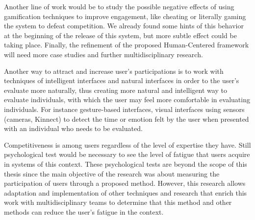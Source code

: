 Another line of work would be to study the possible negative effects of using gamification
techniques to improve engagement, like cheating or literally gaming the system
to defeat competition. We already found some hints of this behavior at the
beginning of the release of this system, but more subtle effect could be taking
place. Finally, the refinement of the proposed Human-Centered framework will
need more case studies and further multidisciplinary research.

Another way to attract and increase user’s participations is to work with
techniques of intelligent interfaces and natural interfaces in order to the
user's evaluate more naturally, thus creating more natural and intelligent way
to evaluate individuals, with which the user may feel more comfortable in
evaluating individuals. For instance  gesture-based interfaces, visual
interfaces using sensors (cameras, Kinnect) to detect the time or emotion felt
by the user when presented with an individual who needs to be evaluated.

Competitiveness is among users regardless of the level of expertise they have.
Still psychological test would be necessary to see the level of fatigue that
users acquire in systems of this context. These psychological tests are beyond
the scope of this thesis since the main objective of the research was about
measuring the participation of users through a proposed method. However, this
research allows adaptation and implementation of other techniques and research
that enrich this work with multidisciplinary teams to determine that this method
and other methods can reduce the user's fatigue in the context.
